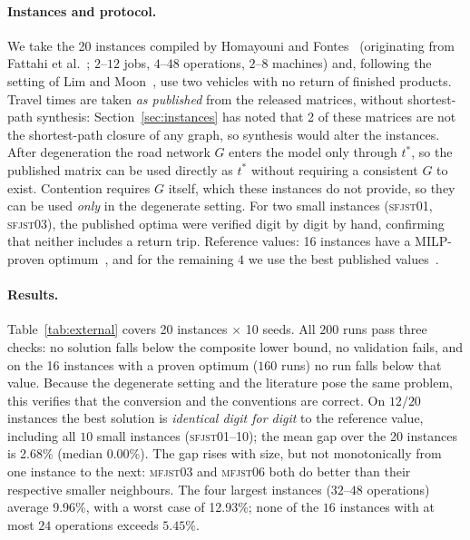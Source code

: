 \documentclass[manuscript,screen,review]{acmart}
\newcommand{\NSeeds}{10}
\newcommand{\PubNInst}{20}
\newcommand{\PubNOpt}{16}                 %
\newcommand{\PubNMatch}{12}               %
\newcommand{\PubGapMean}{2.68\%}          %
\newcommand{\PubGapMed}{0.00\%}
\newcommand{\PubGapMax}{12.93\%}
\newcommand{\PubGapBig}{9.96\%}           %
\newcommand{\PubNLayoutBad}{2}            %
\begin{document}
\paragraph{Instances and protocol.}
We take the \PubNInst{} instances compiled by Homayouni and Fontes~\cite{homayouni2021production} (originating from Fattahi et al.~\cite{fattahi2007mathematical}; $2$--$12$ jobs, $4$--$48$ operations, $2$--$8$ machines) and, following the setting of Lim and Moon~\cite{lim2023twophase}, use two vehicles with no return of finished products. Travel times are taken \emph{as published} from the released matrices, without shortest-path synthesis: Section~\ref{sec:instances} has noted that \PubNLayoutBad{} of these matrices are not the shortest-path closure of any graph, so synthesis would alter the instances.
After degeneration the road network $G$ enters the model only through $t^{*}$, so the published matrix can be used directly as $t^{*}$ without requiring a consistent $G$ to exist. Contention requires $G$ itself, which these instances do not provide, so they can be used \emph{only} in the degenerate setting.
For two small instances (\textsc{sfjst}01, \textsc{sfjst}03), the published optima were verified digit by digit by hand, confirming that neither includes a return trip.
Reference values: \PubNOpt{} instances have a MILP-proven optimum~\cite{homayouni2021production}, and for the remaining $4$ we use the best published values~\cite{lim2023twophase}.

\paragraph{Results.}
Table~\ref{tab:external} covers \PubNInst{} instances $\times$ \NSeeds{} seeds. All $200$ runs pass three checks: no solution falls below the composite lower bound, no validation fails, and on the \PubNOpt{} instances with a proven optimum ($160$ runs) no run falls below that value. Because the degenerate setting and the literature pose the same problem, this verifies that the conversion and the conventions are correct.
On $\PubNMatch{}/\PubNInst{}$ instances the best solution is \emph{identical digit for digit} to the reference value, including all $10$ small instances (\textsc{sfjst}01--10); the mean gap over the \PubNInst{} instances is \PubGapMean{} (median \PubGapMed{}).
The gap rises with size, but not monotonically from one instance to the next: \textsc{mfjst}03 and \textsc{mfjst}06 both do better than their respective smaller neighbours. The four largest instances ($32$--$48$ operations) average \PubGapBig{}, with a worst case of \PubGapMax{}; none of the $16$ instances with at most $24$ operations exceeds $5.45\%$.
\end{document}
